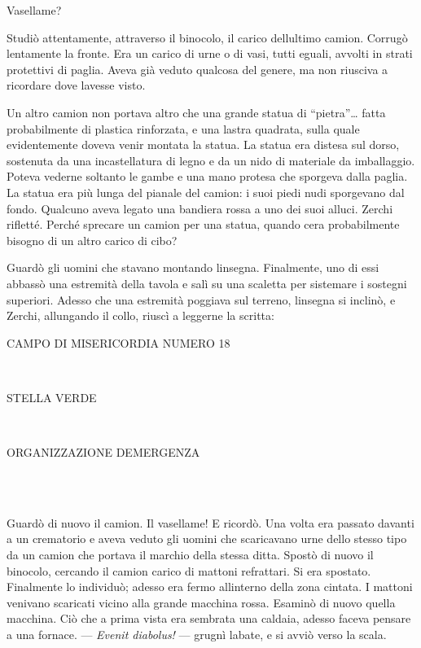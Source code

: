 Vasellame?

Studiò attentamente, attraverso il binocolo, il carico
dell\textquotesingle ultimo camion. Corrugò lentamente la fronte. Era un
carico di urne o di vasi, tutti eguali, avvolti in strati protettivi di
paglia. Aveva già veduto qualcosa del genere, ma non riusciva a
ricordare dove l\textquotesingle avesse visto.

Un altro camion non portava altro che una grande statua di
``pietra''\ldots{} fatta probabilmente di plastica rinforzata, e una
lastra quadrata, sulla quale evidentemente doveva venir montata la
statua. La statua era distesa sul dorso, sostenuta da una incastellatura
di legno e da un nido di materiale da imballaggio. Poteva vederne
soltanto le gambe e una mano protesa che sporgeva dalla paglia. La
statua era più lunga del pianale del camion: i suoi piedi nudi
sporgevano dal fondo. Qualcuno aveva legato una bandiera rossa a uno dei
suoi alluci. Zerchi rifletté. Perché sprecare un camion per una statua,
quando c\textquotesingle era probabilmente bisogno di un altro carico di
cibo?

Guardò gli uomini che stavano montando l\textquotesingle insegna.
Finalmente, uno di essi abbassò una estremità della tavola e salì su una
scaletta per sistemare i sostegni superiori. Adesso che una estremità
poggiava sul terreno, l\textquotesingle insegna si inclinò, e Zerchi,
allungando il collo, riuscì a leggerne la scritta:

\begin{center} 
	CAMPO DI MISERICORDIA NUMERO 18
\end{center}
\leavevmode\\
\begin{center} 
	STELLA VERDE
\end{center}
\leavevmode\\
\begin{center}
	ORGANIZZAZIONE D\textquotesingle EMERGENZA
\end{center}
\leavevmode\\

~

Guardò di nuovo il camion. Il vasellame! E ricordò. Una volta era
passato davanti a un crematorio e aveva veduto gli uomini che
scaricavano urne dello stesso tipo da un camion che portava il marchio
della stessa ditta. Spostò di nuovo il binocolo, cercando il camion
carico di mattoni refrattari. Si era spostato. Finalmente lo individuò;
adesso era fermo all\textquotesingle interno della zona cintata. I
mattoni venivano scaricati vicino alla grande macchina rossa. Esaminò di
nuovo quella macchina. Ciò che a prima vista era sembrata una caldaia,
adesso faceva pensare a una fornace. --- \emph{Evenit diabolus!} ---
grugnì l\textquotesingle abate, e si avviò verso la scala.

